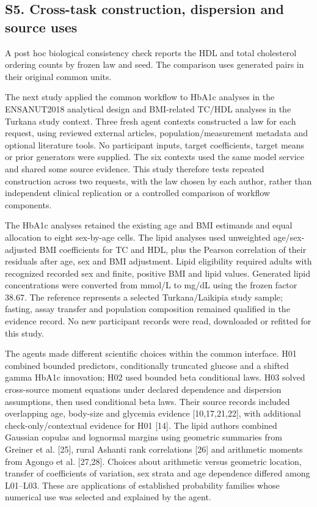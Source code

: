 \documentclass[11pt,letterpaper]{article}
\begin{document}
\subsection*{S5. Cross-task construction, dispersion and source uses}

A post hoc biological consistency check reports the HDL and total cholesterol ordering counts by frozen law and seed. The comparison uses generated pairs in their original common units.


The next study applied the common workflow to HbA1c analyses in the ENSANUT2018 analytical design and BMI-related TC/\allowbreak{}HDL analyses in the Turkana study context. Three fresh agent contexts constructed a law for each request, using reviewed external articles, population/\allowbreak{}measurement metadata and optional literature tools. No participant inputs, target coefficients, target means or prior generators were supplied. The six contexts used the same model service and shared some source evidence. This study therefore tests repeated construction across two requests, with the law chosen by each author, rather than independent clinical replication or a controlled comparison of workflow components.


The HbA1c analyses retained the existing age and BMI estimands and equal allocation to eight sex-by-age cells. The lipid analyses used unweighted age/\allowbreak{}sex-adjusted BMI coefficients for TC and HDL, plus the Pearson correlation of their residuals after age, sex and BMI adjustment. Lipid eligibility required adults with recognized recorded sex and finite, positive BMI and lipid values. Generated lipid concentrations were converted from mmol/\allowbreak{}L to mg/\allowbreak{}dL using the frozen factor 38.67. The reference represents a selected Turkana/\allowbreak{}Laikipia study sample; fasting, assay transfer and population composition remained qualified in the evidence record. No new participant records were read, downloaded or refitted for this study.


The agents made different scientific choices within the common interface. H01 combined bounded predictors, conditionally truncated glucose and a shifted gamma HbA1c innovation; H02 used bounded beta conditional laws. H03 solved cross-source moment equations under declared dependence and dispersion assumptions, then used conditional beta laws. Their source records included overlapping age, body-size and glycemia evidence [10,17,21,22], with additional check-only/\allowbreak{}contextual evidence for H01 [14]. The lipid authors combined Gaussian copulas and lognormal margins using geometric summaries from Greiner et al. [25], rural Ashanti rank correlations [26] and arithmetic moments from Agongo et al. [27,28]. Choices about arithmetic versus geometric location, transfer of coefficients of variation, sex strata and age dependence differed among L01–\allowbreak{}L03. These are applications of established probability families whose numerical use was selected and explained by the agent.
\end{document}
